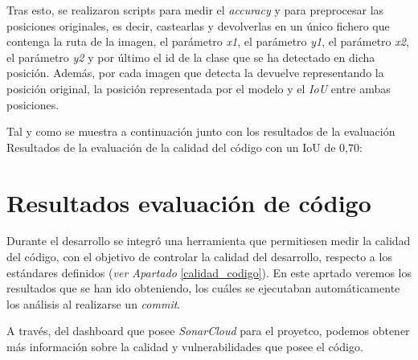 Tras esto, se realizaron scripts para medir el \textit{accuracy} y para preprocesar las posiciones originales, es decir, castearlas y devolverlas en un único fichero que contenga la ruta de la imagen, el parámetro \textit{x1}, el parámetro \textit{y1}, el parámetro \textit{x2}, el parámetro \textit{y2} y por último el id de la clase que se ha detectado en dicha posición.
Además, por cada imagen que detecta la devuelve representando la posición original, la posición representada por el modelo y el \textit{IoU} entre ambas posiciones.

\clearpage

Tal y como se muestra a continuación junto con los resultados de la evaluación
Resultados de la evaluación de la calidad del código con un IoU de 0,70:


\section{Resultados evaluación de código} 
Durante el desarrollo se integró una herramienta que permitiesen medir la calidad del código, con el objetivo de controlar la calidad del desarrollo, respecto a los estándares definidos (\textit{ver Apartado }\ref{calidad_codigo}).
En este aprtado veremos los resultados que se han ido obteniendo, los cuáles se ejecutaban automáticamente los análisis al realizarse un \textit{commit}.


\clearpage

A través, del dashboard que posee \textit{SonarCloud} para el proyetco, podemos obtener más información sobre la calidad y vulnerabilidades que posee el código.

 \label{dashboard}

